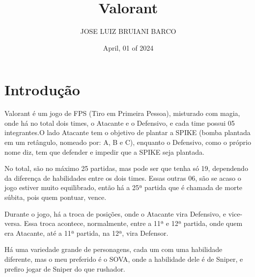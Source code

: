 \documentclass[a4paper, 12pt]{article}
\title{Valorant}
\author{JOSE LUIZ BRUIANI BARCO}
\date{April, 01 of 2024}
\begin{document}
\maketitle
\section{Introdução}
Valorant é um jogo de FPS (Tiro em Primeira Pessoa), misturado com magia, onde há no total dois times, o Atacante e o Defensivo, e cada time possui 05 integrantes.O lado Atacante tem o objetivo de plantar a SPIKE (bomba plantada em um retângulo, nomeado por: A, B e C), enquanto o Defensivo, como o próprio nome diz, tem que defender e impedir que a SPIKE seja plantada.

No total, são no máximo 25 partidas, mas pode ser que tenha só 19, dependendo da diferença de habilidades entre os dois times. Essas outras 06, são se acaso o jogo estiver muito equilibrado, então há a 25ª partida que é chamada de morte súbita, pois quem pontuar, vence.

Durante o jogo, há a troca de posições, onde o Atacante vira Defensivo, e vice-versa. Essa troca acontece, normalmente, entre a 11ª e 12ª partida, onde quem era Atacante, até a 11ª partida, na 12ª, vira Defensor.

Há uma variedade grande de personagens, cada um com uma habilidade diferente, mas o meu preferido é o SOVA, onde a habilidade dele é de Sniper, e prefiro jogar de Sniper do que rushador.
\end{document}

